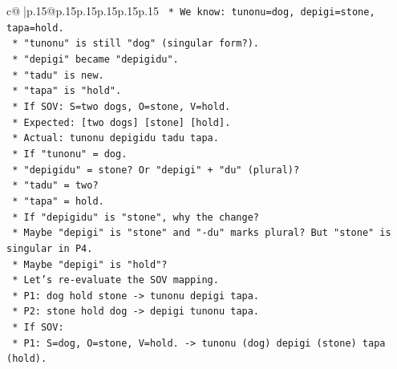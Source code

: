 \documentclass{article}
\begin{document}
{\begin{supertabular}{c@{$\;$}|p{.15\linewidth}@{}p{.15\linewidth}p{.15\linewidth}p{.15\linewidth}p{.15\linewidth}p{.15\linewidth}}
{{{\texttt{                                            *   We know: tunonu=dog, depigi=stone, tapa=hold.} \\
\texttt{                                            *   "tunonu" is still "dog" (singular form?).} \\
\texttt{                                            *   "depigi" became "depigidu".} \\
\texttt{                                            *   "tadu" is new.} \\
\texttt{                                            *   "tapa" is "hold".} \\
\texttt{                                            *   If SOV: S=two dogs, O=stone, V=hold.} \\
\texttt{                                            *   Expected: {[}two dogs{]} {[}stone{]} {[}hold{]}.} \\
\texttt{                                            *   Actual: tunonu depigidu tadu tapa.} \\
\texttt{                                            *   If "tunonu" = dog.} \\
\texttt{                                            *   "depigidu" = stone? Or "depigi" + "du" (plural)?} \\
\texttt{                                            *   "tadu" = two?} \\
\texttt{                                            *   "tapa" = hold.} \\
\texttt{                                            *   If "depigidu" is "stone", why the change?} \\
\texttt{                                            *   Maybe "depigi" is "stone" and "{-}du" marks plural? But "stone" is singular in P4.} \\
\texttt{                                            *   Maybe "depigi" is "hold"?} \\
\texttt{                                            *   Let's re{-}evaluate the SOV mapping.} \\
\texttt{                                            *   P1: dog hold stone {-}> tunonu depigi tapa.} \\
\texttt{                                            *   P2: stone hold dog {-}> depigi tunonu tapa.} \\
\texttt{                                            *   If SOV:} \\
\texttt{                                                *   P1: S=dog, O=stone, V=hold. {-}> tunonu (dog) depigi (stone) tapa (hold).} \\
}}}
\end{supertabular}}
\end{document}
